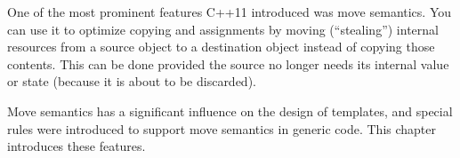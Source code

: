 One of the most prominent features C++11 introduced was move semantics. You can use it to optimize copying and assignments by moving (“stealing”) internal resources from a source object to a destination object instead of copying those contents. This can be done provided the source no longer needs its internal value or state (because it is about to be discarded).

Move semantics has a significant influence on the design of templates, and special rules were introduced to support move semantics in generic code. This chapter introduces these features.